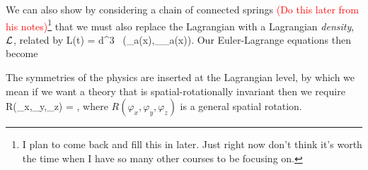 We can also show by considering a chain of connected springs \textcolor{red}{(Do this later from his notes)}\footnote{I plan to come back and fill this in later. Just right now don't think it's worth the time when I have so many other courses to be focusing on.} that we must also replace the Lagrangian with a Lagrangian \textit{density}, $\mathcal{L}$, related by 
\be 
\label{eqn:LtocL}
    L(t) = \int d^3 \, \cL\big(\phi_a(x),\p_{\mu}\phi_a(x)\big).
\ee 
Our Euler-Lagrange equations then become

The symmetries of the physics are inserted at the Lagrangian level, by which we mean if we want a theory that is spatial-rotationally invariant then we require 
\bse 
    R(\varphi_x,\varphi_y,\varphi_z) \cL = \cL,
\ese
where $R(\varphi_x,\varphi_y,\varphi_z)$ is a general spatial rotation. 

